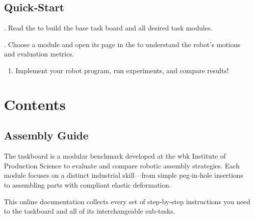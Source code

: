 \documentclass[letterpaper,10pt,english]{sphinxmanual}
\begin{document}
\section{Quick‑Start}
\label{\detokenize{index:quickstart}}
. Read the {\hyperref[\detokenize{wbk_challenge_overview::doc}]{}} to build the base task board and all
desired task modules.

. Choose a module and open its page in the {\hyperref[\detokenize{wbk_challenge_robot_tasks_overview::doc}]{}}
to understand the robot’s motions and evaluation metrics.
\begin{enumerate}
%
\setcounter{enumi}{2}
\item {} 
\sphinxAtStartPar
Implement your robot program, run experiments, and compare results!

\end{enumerate}


\chapter{Contents}
\label{\detokenize{index:contents}}
\sphinxstepscope


\section{Assembly Guide}
\label{\detokenize{wbk_challenge_overview:assembly-guide}}\label{\detokenize{wbk_challenge_overview::doc}}
\sphinxAtStartPar
The  taskboard is a modular benchmark developed at the wbk Institute of Production Science to evaluate and compare robotic assembly strategies.
Each module focuses on a distinct industrial skill—from simple peg‑in‑hole insertions to assembling parts with compliant elastic deformation.

\sphinxAtStartPar
This online documentation collects every set of step‑by‑step instructions you need to  the taskboard and all of its interchangeable sub‑tasks.
\end{document}
